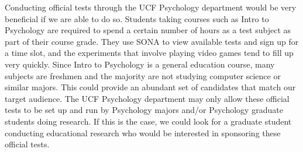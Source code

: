 Conducting official tests through the UCF Psychology department would be very beneficial if we are able to do so. Students taking courses such as Intro to Psychology are required to spend a certain number of hours as a test subject as part of their course grade. They use SONA to view available tests and sign up for a time slot, and the experiments that involve playing video games tend to fill up very quickly. Since Intro to Psychology is a general education course, many subjects are freshmen and the majority are not studying computer science or similar majors. This could provide an abundant set of candidates that match our target audience. The UCF Psychology department may only allow these official tests to be set up and run by Psychology majors and/or Psychology graduate students doing research. If this is the case, we could look for a graduate student conducting educational research who would be interested in sponsoring these official tests.\\





